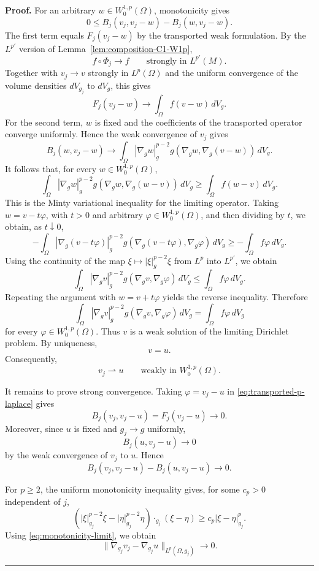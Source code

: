 \documentclass[10pt,a4paper]{amsart}
\newenvironment{proof}[1][Proof]{\textbf{#1.} }{\hfill\rule{0.5em}{0.5em}}
\begin{document}
\begin{proof}
For an arbitrary $w{ \in }W_0^{1,p}(\Omega)$, monotonicity gives
\[
0\leq B_j(v_j,v_j-w)-B_j(w,v_j-w).
\]
The first term equals $F_j(v_j-w)$ by the transported weak formulation.
By the $L^{p'}$ version of Lemma~\ref{lem:composition-C1-W1p},
\[
f\circ\Phi_j\longrightarrow f
\qquad\text{strongly in }L^{p'}(M).
\]
Together with $v_j\to v$ strongly in $L^p(\Omega)$ and the uniform
convergence of the volume densities $dV_{g_j}$ to $dV_g$, this gives
\[
F_j(v_j-w)\longrightarrow \int_\Omega f(v-w)\,dV_g.
\]
For the second term, $w$ is fixed and the coefficients of the transported
operator converge uniformly. Hence the weak convergence of $v_j$ gives
\[
B_j(w,v_j-w)\longrightarrow
\int_\Omega
|\nabla_g w|_g^{p-2}
 g(\nabla_g w,\nabla_g(v-w))\,dV_g.
\]
It follows that, for every $w\in W_0^{1,p}(\Omega)$,
\[
\int_\Omega
|\nabla_g w|_g^{p-2}
 g(\nabla_g w,\nabla_g(w-v))\,dV_g
\geq
\int_\Omega f(w-v)\,dV_g.
\]
This is the Minty variational inequality for the limiting operator. Taking
$w=v-t\varphi$, with $t>0$ and arbitrary $\varphi\in W_0^{1,p}(\Omega)$,
and then dividing by $t$, we obtain, as $t\downarrow0$,
\[
-\int_\Omega
|\nabla_g(v-t\varphi)|_g^{p-2}
 g(\nabla_g(v-t\varphi),\nabla_g\varphi)\,dV_g
\geq
-\int_\Omega f\varphi\,dV_g.
\]
Using the continuity of the map
$\xi\mapsto|\xi|_g^{p-2}\xi$ from $L^p$ into $L^{p'}$, we obtain
\[
\int_\Omega
|\nabla_g v|_g^{p-2}
 g(\nabla_g v,\nabla_g\varphi)\,dV_g
\leq
\int_\Omega f\varphi\,dV_g.
\]
Repeating the argument with $w=v+t\varphi$ yields the reverse inequality.
Therefore
\[
\int_\Omega
|\nabla_g v|_g^{p-2}
 g(\nabla_g v,\nabla_g\varphi)\,dV_g
=
\int_\Omega f\varphi\,dV_g
\]
for every $\varphi\in W_0^{1,p}(\Omega)$. Thus $v$ is a weak solution of
the limiting Dirichlet problem. By uniqueness,
\[
v=u.
\]
Consequently,
\[
v_j\rightharpoonup u
\qquad\text{weakly in }W_0^{1,p}(\Omega).
\]

It remains to prove strong convergence. Taking $\varphi=v_j-u$ in
\eqref{eq:transported-p-laplace} gives
\[
B_j(v_j,v_j-u)=F_j(v_j-u)\longrightarrow0.
\]
Moreover, since $u$ is fixed and $g_j\to g$ uniformly,
\[
B_j(u,v_j-u)\longrightarrow0
\]
by the weak convergence of $v_j$ to $u$. Hence
\begin{equation}
B_j(v_j,v_j-u)-B_j(u,v_j-u)\longrightarrow0.
\label{eq:monotonicity-limit}
\end{equation}

For $p\ge2$, the uniform monotonicity inequality gives, for some
$c_p>0$ independent of $j$,
\[
\left(
|\xi|_{g_j}^{p-2}\xi-|\eta|_{g_j}^{p-2}\eta
\right)\cdot_{g_j}(\xi-\eta)
\ge c_p|\xi-\eta|_{g_j}^p.
\]
Using \eqref{eq:monotonicity-limit}, we obtain
\[
\|\nabla_{g_j}v_j-\nabla_{g_j}u\|_{L^p(\Omega,g_j)}\longrightarrow0.
\]


\end{proof}
\end{document}
